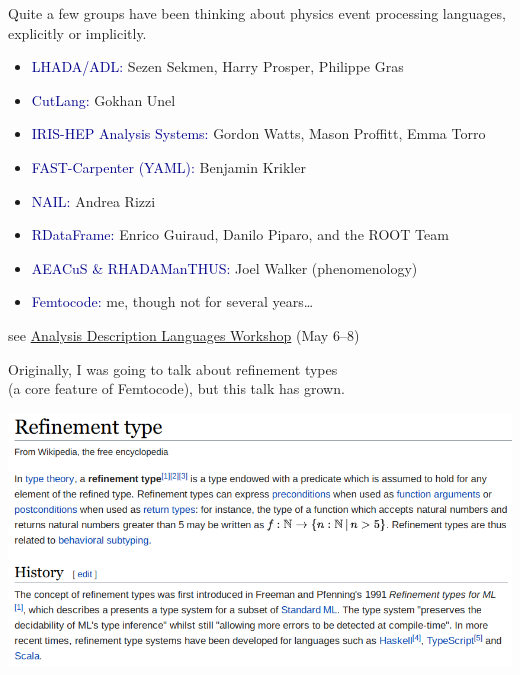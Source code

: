 \documentclass[aspectratio=169]{beamer}
\begin{document}
\begin{frame}{}
\large
\vspace{1.25 cm}
Quite a few groups have been thinking about physics event processing languages, explicitly or implicitly.

\vspace{0.25 cm}
\begin{itemize}
\item \textcolor{darkblue}{LHADA/ADL:} Sezen Sekmen, Harry Prosper, Philippe Gras
\item \textcolor{darkblue}{CutLang:} Gokhan Unel
\item \textcolor{darkblue}{IRIS-HEP Analysis Systems:} Gordon Watts, Mason Proffitt, Emma Torro
\item \textcolor{darkblue}{FAST-Carpenter (YAML):} Benjamin Krikler
\item \textcolor{darkblue}{NAIL:} Andrea Rizzi
\item \textcolor{darkblue}{RDataFrame:} Enrico Guiraud, Danilo Piparo, and the ROOT Team
\item \textcolor{darkblue}{AEACuS \& RHADAManTHUS:} Joel Walker (phenomenology)
\item \textcolor{darkblue}{Femtocode:} me, though not for several years\ldots
\end{itemize}

\vspace{0.25 cm}
\small \hfill see \textcolor{blue}{\href{https://indico.cern.ch/event/769263/timetable/}{Analysis Description Languages Workshop}} (May 6--8)
\end{frame}

\begin{frame}{}
\Large
\vspace{1.25 cm}
\begin{center}
Originally, I was going to talk about refinement types \\ (a core feature of Femtocode), but this talk has grown.
\end{center}
\end{frame}

\begin{frame}{}
\vspace{1.25 cm}
\includegraphics[width=\linewidth]{refinement-wikipedia.png}
\end{frame}
\end{document}
